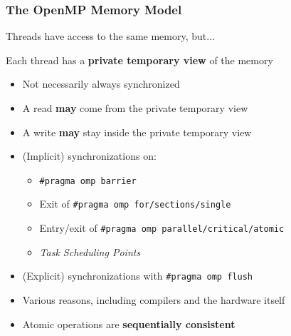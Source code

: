 \documentclass[xcolor={x11names,svgnames},x11names,svgnames]{beamer}
\begin{document}
\begin{frame}[label=omp_memory_model]
  \frametitle{The OpenMP Memory Model}

  Threads have access to the same memory, but...

\begin{alertblock}{Each thread has a \textbf{private temporary view} of the memory}
  \begin{itemize}
  \item Not necessarily always synchronized

  \item A read \textbf{may} come from the private temporary view
    
  \item A write \textbf{may} stay inside the private temporary view

  \item (Implicit) synchronizations on:
    \begin{itemize}
    \item \texttt{\#pragma omp barrier}
    \item Exit of \texttt{\#pragma omp for/sections/single}
    \item Entry/exit of \texttt{\#pragma omp parallel/critical/atomic}
    \item \emph{Task Scheduling Points}
    \end{itemize}

  \item (Explicit) synchronizations with \texttt{\#pragma omp flush}
  \end{itemize}
\end{alertblock}

\begin{itemize}
\item Various reasons, including compilers and the hardware itself
\item Atomic operations are \textbf{sequentially consistent}
\end{itemize}
\end{frame}

\end{document}

